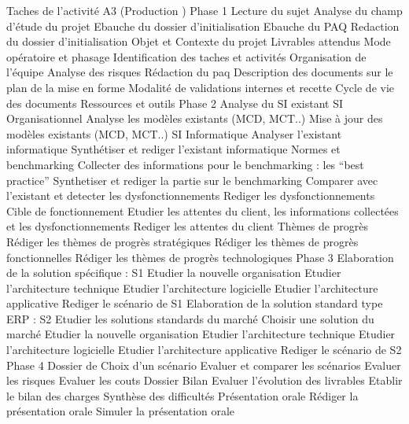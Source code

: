 {    Taches de l’activité A3 (Production )
        Phase 1
            Lecture du sujet
            Analyse du champ d’étude du projet
            Ebauche du dossier d’initialisation
            Ebauche du PAQ
            Redaction du dossier d’initialisation
                Objet et Contexte du projet
                Livrables attendus
                Mode opératoire et phasage
                Identification des taches et activités
                Organisation de l’équipe
                Analyse des risques
            Rédaction du paq
                Description des documents sur le plan de la mise en forme
                Modalité de validations internes et recette
                Cycle de vie des documents
                Ressources et outils
        Phase 2
            Analyse du SI existant
                SI Organisationnel
                    Analyse les modèles existants (MCD, MCT..)
                    Mise à jour des modèles existants (MCD, MCT..)
                SI Informatique
                    Analyser l’existant informatique
                    Synthétiser et rediger l’existant informatique
            Normes et benchmarking
                Collecter des informations pour le benchmarking : les “best practice”
                Synthetiser et rediger la partie sur le benchmarking
                Comparer avec l’existant et detecter les dysfonctionnements
                Rediger les dysfonctionnements
            Cible de fonctionnement
                Etudier les attentes du client, les informations collectées et les dysfonctionnements
                Rediger les attentes du client
            Thèmes de progrès
                Rédiger les thèmes de progrès stratégiques
                Rédiger les thèmes de progrès fonctionnelles
                Rédiger les thèmes de progrès technologiques
        Phase 3
            Elaboration de la solution spécifique : S1
                Etudier la nouvelle organisation
                Etudier l’architecture technique
                Etudier l’architecture logicielle
                Etudier l’architecture applicative
                Rediger le scénario de S1
            Elaboration de la solution standard type ERP : S2
                Etudier les solutions standards du marché
                Choisir une solution du marché
                Etudier la nouvelle organisation
                Etudier l’architecture technique
                Etudier l’architecture logicielle
                Etudier l’architecture applicative
                Rediger le scénario de S2
        Phase 4
            Dossier de Choix d’un scénario
                Evaluer et comparer les scénarios
                Evaluer les risques
                Evaluer les couts
            Dossier Bilan
                Evaluer l’évolution des livrables
                Etablir le bilan des charges
                Synthèse des difficultés
            Présentation orale
                Rédiger la présentation orale
                Simuler la présentation orale



}
